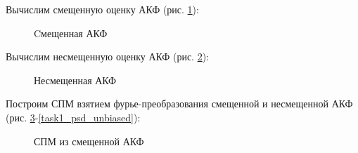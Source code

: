 \documentclass[a4paper,oneside,14pt]{extreport}
\begin{document}
Вычислим смещенную оценку АКФ (рис. \ref{task1_acf_biased}):
\begin{figure}[!h]
	\caption{Cмещенная АКФ}
	\label{task1_acf_biased}
\end{figure}

\newpage
Вычислим несмещенную оценку АКФ (рис. \ref{task1_acf_unbiased}):
\begin{figure}[!h]
	\caption{Несмещенная АКФ}
	\label{task1_acf_unbiased}
\end{figure}

Построим СПМ взятием фурье-преобразования смещенной и несмещенной АКФ (рис. \ref{task1_psd_biased}-\ref{task1_psd_unbiased}):
\begin{figure}[!h]
	\caption{СПМ из смещенной АКФ}
	\label{task1_psd_biased}
\end{figure}
\end{document}
